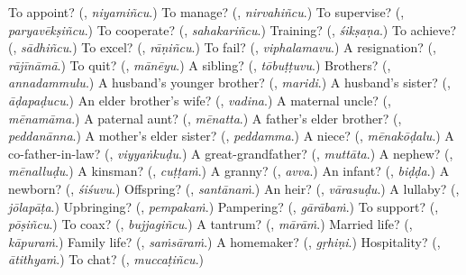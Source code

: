 \begin{tcolorbox}[breakable,colback=teal!4,colframe=teal!35!black,title={Before you move on}]
To appoint? (\textbf{}, \emph{niyamiñcu}.) To manage? (\textbf{}, \emph{nirvahiñcu}.) To supervise? (\textbf{}, \emph{paryavēkṣiñcu}.) To cooperate? (\textbf{}, \emph{sahakariñcu}.) Training? (\textbf{}, \emph{śikṣaṇa}.) To achieve? (\textbf{}, \emph{sādhiñcu}.) To excel? (\textbf{}, \emph{rāṇiñcu}.) To fail? (\textbf{}, \emph{viphalamavu}.) A resignation? (\textbf{}, \emph{rājīnāmā}.) To quit? (\textbf{}, \emph{mānēyu}.) A sibling? (\textbf{}, \emph{tōbuṭṭuvu}.) Brothers? (\textbf{}, \emph{annadammulu}.) A husband's younger brother? (\textbf{}, \emph{maridi}.) A husband's sister? (\textbf{}, \emph{āḍapaḍucu}.) An elder brother's wife? (\textbf{}, \emph{vadina}.) A maternal uncle? (\textbf{}, \emph{mēnamāma}.) A paternal aunt? (\textbf{}, \emph{mēnatta}.) A father's elder brother? (\textbf{}, \emph{peddanānna}.) A mother's elder sister? (\textbf{}, \emph{peddamma}.) A niece? (\textbf{}, \emph{mēnakōḍalu}.) A co-father-in-law? (\textbf{}, \emph{viyyaṅkuḍu}.) A great-grandfather? (\textbf{}, \emph{muttāta}.) A nephew? (\textbf{}, \emph{mēnalluḍu}.) A kinsman? (\textbf{}, \emph{cuṭṭaṁ}.) A granny? (\textbf{}, \emph{avva}.) An infant? (\textbf{}, \emph{biḍḍa}.) A newborn? (\textbf{}, \emph{śiśuvu}.) Offspring? (\textbf{}, \emph{santānaṁ}.) An heir? (\textbf{}, \emph{vārasuḍu}.) A lullaby? (\textbf{}, \emph{jōlapāṭa}.) Upbringing? (\textbf{}, \emph{pempakaṁ}.) Pampering? (\textbf{}, \emph{gārābaṁ}.) To support? (\textbf{}, \emph{pōṣiñcu}.) To coax? (\textbf{}, \emph{bujjagiñcu}.) A tantrum? (\textbf{}, \emph{mārāṁ}.) Married life? (\textbf{}, \emph{kāpuraṁ}.) Family life? (\textbf{}, \emph{saṁsāraṁ}.) A homemaker? (\textbf{}, \emph{gṛhiṇi}.) Hospitality? (\textbf{}, \emph{ātithyaṁ}.) To chat? (\textbf{}, \emph{muccaṭiñcu}.)
\end{tcolorbox}
